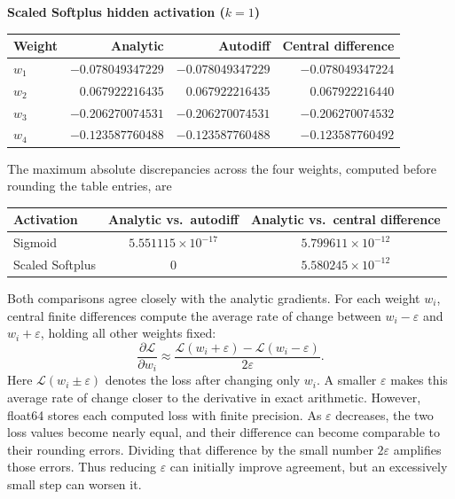\documentclass[12pt]{article}
\let\epsilon\varepsilon
\begin{document}
\begin{enumerate}
\begin{enumerate}[label=\textbf{\Alph*.}, leftmargin=*]
       \begin{center}
       \textbf{Scaled Softplus hidden activation ($k=1$)}

       {\small
       \begin{tabular}{l r r r}
           \toprule
           Weight & Analytic & Autodiff & Central difference \\
           \midrule
           $w_1$ & $-0.078049347229$ & $-0.078049347229$ & $-0.078049347224$ \\
           $w_2$ & $ 0.067922216435$ & $ 0.067922216435$ & $ 0.067922216440$ \\
           $w_3$ & $-0.206270074531$ & $-0.206270074531$ & $-0.206270074532$ \\
           $w_4$ & $-0.123587760488$ & $-0.123587760488$ & $-0.123587760492$ \\
           \bottomrule
       \end{tabular}}
       \end{center}

       The maximum absolute discrepancies across the four weights,
       computed before rounding the table entries, are
       \begin{center}
       \begin{tabular}{l c c}
           \toprule
           Activation & Analytic vs.\ autodiff & Analytic vs.\ central difference \\
           \midrule
           Sigmoid & $5.551115\times10^{-17}$ & $5.799611\times10^{-12}$ \\
           Scaled Softplus & $0$ & $5.580245\times10^{-12}$ \\
           \bottomrule
       \end{tabular}
       \end{center}
       Both comparisons agree closely with the analytic gradients.
       For each weight $w_i$, central finite differences compute the
       average rate of change between $w_i-\epsilon$ and $w_i+\epsilon$,
       holding all other weights fixed:
       \[
           \frac{\partial\mathcal L}{\partial w_i}
           \approx\frac{\mathcal L(w_i+\epsilon)
                        -\mathcal L(w_i-\epsilon)}{2\epsilon}.
       \]
       Here $\mathcal L(w_i\pm\epsilon)$ denotes the loss after changing
       only $w_i$. A smaller $\epsilon$ makes this average rate of change
       closer to the derivative in exact arithmetic. However, float64
       stores each computed loss with finite precision. As $\epsilon$
       decreases, the two loss values become nearly equal, and their
       difference can become comparable to their rounding errors.
       Dividing that difference by the small number $2\epsilon$
       amplifies those errors. Thus reducing $\epsilon$ can initially
       improve agreement, but an excessively small step can worsen it.
   \end{enumerate}


\end{enumerate}
\end{document}
